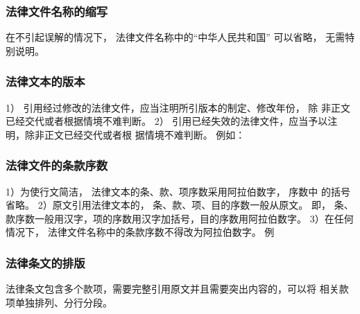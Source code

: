 \documentclass{article}
\begin{document}
\subsubsection{法律文件名称的缩写}
在不引起误解的情况下， 法律文件名称中的“中华人民共和国” 可以省略，
无需特别说明。 


\subsubsection{法律文本的版本}
1） 引用经过修改的法律文件，应当注明所引版本的制定、修改年份， 除
非正文已经交代或者根据情境不难判断。
2） 引用已经失效的法律文件，应当予以注明，除非正文已经交代或者根
据情境不难判断。
例如：

\begin{quotation}

\end{quotation}

\subsubsection{法律文件的条款序数}

1）为使行文简洁， 法律文本的条、款、项序数采用阿拉伯数字， 序数中
的括号省略。
2）原文引用法律文本的， 条、款、项、目的序数一般从原文。 即， 条、
款序数一般用汉字，项的序数用汉字加括号，目的序数用阿拉伯数字。
3）在任何情况下， 法律文件名称中的条款序数不得改为阿拉伯数字。 例


\subsubsection{法律条文的排版}

法律条文包含多个款项，需要完整引用原文并且需要突出内容的，可以将
相关款项单独排列、分行分段。
\end{document}
